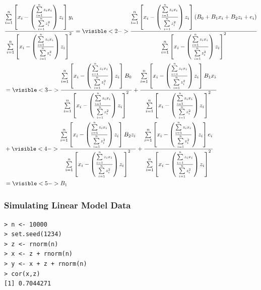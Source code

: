 \documentclass{beamer}
\begin{document}
\begin{frame}

{\footnotesize
\begin{align*}
&\frac{\sum\limits_{i=1}^{n} \left[x_i - \left(\frac{\sum\limits_{i=1}^{n} z_i x_i}{\sum\limits_{i=1}^{n} z_i^2}\right)z_i\right] y_{i}}{\sum\limits_{i=1}^{n} \left[x_i - \left(\frac{\sum\limits_{i=1}^{n} z_i x_i}{\sum\limits_{i=1}^{n} z_i^2}\right)z_i\right]^2} = \visible<2->{\frac{\sum\limits_{i=1}^{n}  \left[x_i - \left(\frac{\sum\limits_{i=1}^{n} z_i x_i}{\sum\limits_{i=1}^{n} z_i^2}\right)z_i\right] (B_{0}+B_{1}x_i+B_{2}z_i+e_i)}{\sum\limits_{i=1}^{n} \left[x_i - \left(\frac{\sum\limits_{i=1}^{n} z_i x_i}{\sum\limits_{i=1}^{n} z_i^2}\right)z_i\right]^2}}\\
&=\visible<3->{\frac{\sum\limits_{i=1}^{n}\left[x_i - \left(\frac{\sum\limits_{i=1}^{n} z_i x_i}{\sum\limits_{i=1}^{n} z_i^2}\right)z_i\right]B_{0}}{\sum\limits_{i=1}^{n}\left[x_i - \left(\frac{\sum\limits_{i=1}^{n} z_i x_i}{\sum\limits_{i=1}^{n} z_i^2}\right)z_i\right]^2}+\frac{\sum\limits_{i=1}^{n}\left[x_i - \left(\frac{\sum\limits_{i=1}^{n} z_i x_i}{\sum\limits_{i=1}^{n} z_i^2}\right)z_i\right]B_{1}x_i}{\sum\limits_{i=1}^{n}\left[x_i - \left(\frac{\sum\limits_{i=1}^{n} z_i x_i}{\sum\limits_{i=1}^{n} z_i^2}\right)z_i\right]^2}}\\
&+\visible<4->{\frac{\sum\limits_{i=1}^{n} \left[x_i - \left(\frac{\sum\limits_{i=1}^{n} z_i x_i}{\sum\limits_{i=1}^{n} z_i^2}\right)z_i\right] B_{2}z_i}{\sum\limits_{i=1}^{n}\left[x_i - \left(\frac{\sum\limits_{i=1}^{n} z_i x_i}{\sum\limits_{i=1}^{n} z_i^2}\right)z_i\right]^2} + \frac{\sum\limits_{i=1}^{n} \left[x_i - \left(\frac{\sum\limits_{i=1}^{n} z_i x_i}{\sum\limits_{i=1}^{n} z_i^2}\right)z_i\right] e_i}{\sum\limits_{i=1}^{n}\left[x_i - \left(\frac{\sum\limits_{i=1}^{n} z_i x_i}{\sum\limits_{i=1}^{n} z_i^2}\right)z_i\right]^2}  }\\
&= \visible<5->{ B_1}
\end{align*}}

\end{frame}



\begin{frame}[fragile]
\frametitle{Simulating Linear Model Data}

\begin{verbatim}
> n <- 10000
> set.seed(1234)
> z <- rnorm(n)
> x <- z + rnorm(n)
> y <- x + z + rnorm(n)
> cor(x,z)
[1] 0.7044271
\end{verbatim}

\end{frame}
\end{document}
